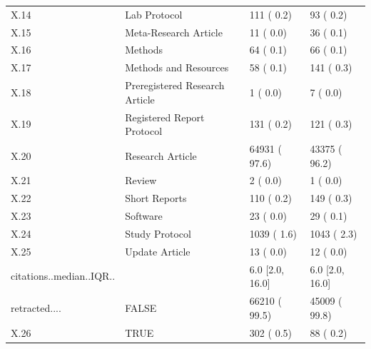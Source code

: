 \begin{table}[ht]
\begin{tabular}{llll}
  X.14 & Lab Protocol &    111 (  0.2)  &     93 (  0.2)  \\ 
  X.15 & Meta-Research Article &     11 (  0.0)  &     36 (  0.1)  \\ 
  X.16 & Methods &     64 (  0.1)  &     66 (  0.1)  \\ 
  X.17 & Methods and Resources &     58 (  0.1)  &    141 (  0.3)  \\ 
  X.18 & Preregistered Research Article &      1 (  0.0)  &      7 (  0.0)  \\ 
  X.19 & Registered Report Protocol &    131 (  0.2)  &    121 (  0.3)  \\ 
  X.20 & Research Article &  64931 ( 97.6)  &  43375 ( 96.2)  \\ 
  X.21 & Review &      2 (  0.0)  &      1 (  0.0)  \\ 
  X.22 & Short Reports &    110 (  0.2)  &    149 (  0.3)  \\ 
  X.23 & Software &     23 (  0.0)  &     29 (  0.1)  \\ 
  X.24 & Study Protocol &   1039 (  1.6)  &   1043 (  2.3)  \\ 
  X.25 & Update Article &     13 (  0.0)  &     12 (  0.0)  \\ 
  citations..median..IQR.. &  &    6.0 [2.0, 16.0] &    6.0 [2.0, 16.0] \\ 
  retracted.... & FALSE &  66210 ( 99.5)  &  45009 ( 99.8)  \\ 
  X.26 & TRUE &    302 (  0.5)  &     88 (  0.2)  \\ 
  \end{tabular}
\end{table}
